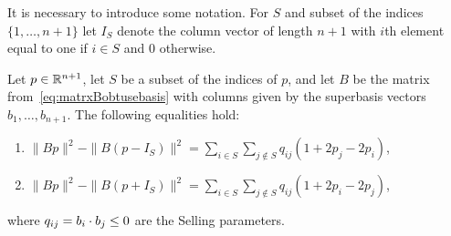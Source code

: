 \documentclass[final,leqno]{siamltex}
\begin{document}
\newcommand{\rng}{\operatorname{rng}}
\newcommand{\subrng}{\operatorname{subr}}
\newcommand{\decrng}{\operatorname{decrng}}

It is necessary to introduce some notation.  For $S$ and subset of the indices $\{1,\dots,n+1\}$ let $I_S$ denote the column vector of length $n+1$ with $i$th element equal to one if $i \in S$ and $0$ otherwise.

\begin{lemma}\label{lem:decSellings}
Let $p \in {\mathbb R}^{n+1}$, let $S$ be a subset of the indices of $p$, and let $B$ be the matrix from~\eqref{eq:matrxBobtusebasis} with columns given by the superbasis vectors $b_1,\dots,b_{n+1}$.  The following equalities hold:
\begin{enumerate}
\item  ${\displaystyle \|Bp\|^2 - \|B(p - I_S)\|^2 = \sum_{i \in S}\sum_{j \notin S}q_{ij}(1 + 2p_j - 2p_i)}$, \label{eq:lem:decSellingsdec}
\item  ${\displaystyle \|Bp\|^2 - \|B(p + I_S)\|^2 = \sum_{i \in S}\sum_{j \notin S}q_{ij}(1 + 2p_i - 2p_j)}$, \label{eq:lem:decSellingsinc}
\end{enumerate}
where $q_{ij} = b_i \cdot b_j \leq 0$ are the Selling parameters.
\end{lemma}
\end{document}

